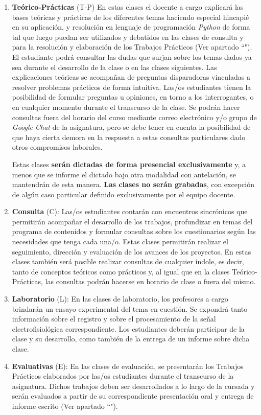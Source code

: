 \documentclass[10pt]{article}
\begin{document}
\begin{enumerate}
    \item \textbf{Teórico-Prácticas} (T-P) En estas clases el docente a cargo explicará las bases teóricas y prácticas de los diferentes temas haciendo especial hincapié en su aplicación, y resolución en lenguaje de programación \textit{Python} de forma tal que luego puedan ser utilizados y debatidos en las clases de consulta y para la resolución y elaboración de los Trabajos Prácticos (Ver apartado ``"). El estudiante podrá consultar las dudas que surjan sobre los temas dados ya sea durante el desarrollo de la clase o en las clases siguientes. Las explicaciones teóricas se acompañan de preguntas disparadoras vinculadas a resolver problemas prácticos de forma intuitiva. Las/os estudiantes tienen la posibilidad de formular preguntas u opiniones, en torno a los interrogantes, o en cualquier momento durante el transcurso de la clase. Se podrán hacer consultas fuera del horario del curso mediante correo electrónico y/o grupo de \textit{Google Chat} de la asignatura, pero se debe tener en cuenta la posibilidad de que haya cierta demora en la respuesta a estas consultas particulares dado otros compromisos laborales.

    Estas clases \textbf{serán dictadas de forma presencial exclusivamente} y, a menos que se informe el dictado bajo otra modalidad con antelación, se mantendrán de esta manera. \textbf{Las clases no serán grabadas}, con excepción de algún caso particular definido exclusivamente por el equipo docente.
    
    \item \textbf{Consulta} (C): Las/os estudiantes contarán con encuentros sincrónicos que permitirán acompañar el desarrollo de los trabajos, profundizar en temas del programa de contenidos y formular consultas sobre los cuestionarios según las necesidades que tenga cada una/o. Estas clases permitirán realizar el seguimiento, dirección y evaluación de los avances de los proyectos. En estas clases también será posible realizar consultas de cualquier índole, es decir, tanto de conceptos teóricos como prácticos y, al igual que en la clases Teórico-Prácticas, las consultas podrán hacerse en horario de clase o fuera del mismo.
    
    \item \textbf{Laboratorio} (L): En las clases de laboratorio, los profesores a cargo brindarán un ensayo experimental del tema en cuestión. Se expondrá tanto información sobre el registro y sobre el procesamiento de la señal electrofisiológica correspondiente. Los estudiantes deberán participar de la clase y su desarrollo, como también de la entrega de un informe sobre dicha clase. 
    
    \item \textbf{Evaluativas} (E): En las clases de evaluación, se presentarán los Trabajos Prácticos elaborados por las/os estudiantes durante el transcurso de la asignatura. Dichos trabajos deben ser desarrollados a lo largo de la cursada y serán evaluados a partir de su correspondiente presentación oral y entrega de informe escrito 	(Ver apartado ``"). 
    
\end{enumerate}
\end{document}
